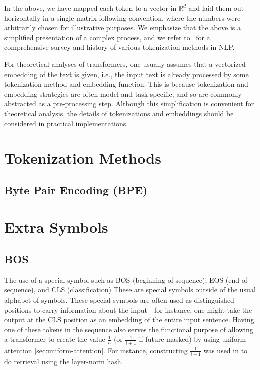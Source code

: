 In the above, we have mapped each token to a vector in \(\mathbb{R}^{d}\) and laid them out horizontally in a single matrix following convention, where the numbers were arbitrarily chosen for illustrative purposes.
We emphasize that the above is a simplified presentation of a complex process, and we refer to~\citep{mielke2021between} for a comprehensive survey and history of various tokenization methods in NLP.



For theoretical analyses of transformers, one usually assumes that a vectorized embedding of the text is given, i.e., the input text is already processed by some tokenization method and embedding function.
This is because tokenization and embedding strategies are often model and task-specific, and so are commonly abstracted as a pre-processing step.
Although this simplification is convenient for theoretical analysis, the details of tokenizations and embeddings should be considered in practical implementations.





\section{Tokenization Methods}

\subsection{Byte Pair Encoding (BPE)}


\section{Extra Symbols}

\subsection{BOS}\label{sec:BOS}

The use of a special symbol such as BOS (beginning of sequence), EOS (end of sequence), and CLS (classification) These are special symbols outside of the usual alphabet of symbols. These special symbols are often used as distinguished positions to carry information about the input - for instance, one might take the output at the CLS position as an embedding of the entire input sentence. Having one of these tokens in the sequence also serves the functional purpose of allowing a transformer to create the value $\frac{1}{n}$ (or $\frac{1}{i+1}$ if future-masked) by using uniform attention \cref{sec:uniform-attention}. For instance, constructing $\frac{1}{i+1}$ was used in \citet{merrill-sabharwal-2024-cot} to do retrieval using the layer-norm hash.

